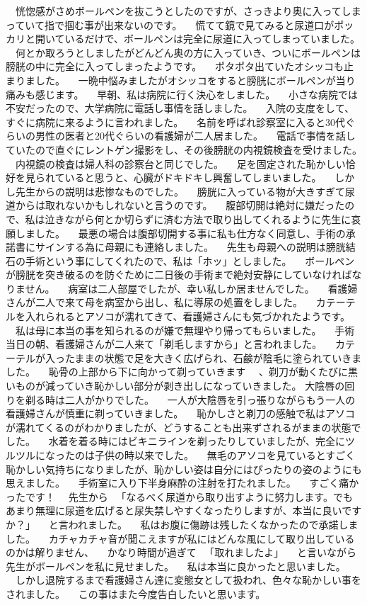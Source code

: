 　恍惚感がさめボールペンを抜こうとしたのですが、さっきより奥に入ってしまっていて指で掴む事が出来ないのです。 
　慌てて鏡で見てみると尿道口がポッカリと開いているだけで、ボールペンは完全に尿道に入ってしまっていました。 
　何とか取ろうとしましたがどんどん奥の方に入っていき、ついにボールペンは膀胱の中に完全に入ってしまったようです。 
　ポタポタ出ていたオシッコも止まりました。 
　一晩中悩みましたがオシッコをすると膀胱にボールペンが当り痛みも感じます。 
　早朝、私は病院に行く決心をしました。 
　小さな病院では不安だったので、大学病院に電話し事情を話しました。 
　入院の支度をして、すぐに病院に来るように言われました。 
　名前を呼ばれ診察室に入ると30代ぐらいの男性の医者と20代ぐらいの看護婦が二人居ました。 
　電話で事情を話していたので直ぐにレントゲン撮影をし、その後膀胱の内視鏡検査を受けました。 
　内視鏡の検査は婦人科の診察台と同じでした。 
　足を固定された恥かしい恰好を見られていると思うと、心臓がドキドキし興奮してしまいました。 
　しかし先生からの説明は悲惨なものでした。 
　膀胱に入っている物が大きすぎて尿道からは取れないかもしれないと言うのです。 
　腹部切開は絶対に嫌だったので、私は泣きながら何とか切らずに済む方法で取り出してくれるように先生に哀願しました。 
　最悪の場合は腹部切開する事に私も仕方なく同意し、手術の承諾書にサインする為に母親にも連絡しました。 
　先生も母親への説明は膀胱結石の手術という事にしてくれたので、私は「ホッ」としました。 
　ボールペンが膀胱を突き破るのを防ぐために二日後の手術まで絶対安静にしていなければなりません。 
　病室は二人部屋でしたが、幸い私しか居ませんでした。 
　看護婦さんが二人で来て母を病室から出し、私に導尿の処置をしました。 
　カテーテルを入れられるとアソコが濡れてきて、看護婦さんにも気づかれたようです。 
　私は母に本当の事を知られるのが嫌で無理やり帰ってもらいました。 
　手術当日の朝、看護婦さんが二人来て「剃毛しますから」と言われました。 
　カテーテルが入ったままの状態で足を大きく広げられ、石鹸が陰毛に塗られていきました。 
　恥骨の上部から下に向かって剃っていきます 
　、剃刀が動くたびに黒いものが減っていき恥かしい部分が剥き出しになっていきました。 
大陰唇の回りを剃る時は二人がかりでした。 
　一人が大陰唇を引っ張りながらもう一人の看護婦さんが慎重に剃っていきました。 
　恥かしさと剃刀の感触で私はアソコが濡れてくるのがわかりましたが、どうすることも出来ずされるがままの状態でした。 
　水着を着る時にはビキニラインを剃ったりしていましたが、完全にツルツルになったのは子供の時以来でした。 
　無毛のアソコを見ているとすごく恥かしい気持ちになりましたが、恥かしい姿は自分にはぴったりの姿のようにも思えました。 
　手術室に入り下半身麻酔の注射を打たれました。 
　すごく痛かったです！ 
　先生から 
　「なるべく尿道から取り出すように努力します。でもあまり無理に尿道を広げると尿失禁しやすくなったりしますが、本当に良いですか？」 
　と言われました。 
　私はお腹に傷跡は残したくなかったので承諾しました。 
　カチャカチャ音が聞こえますが私にはどんな風にして取り出しているのかは解りません、 
　かなり時間が過ぎて 
　「取れましたよ」 
　と言いながら先生がボールペンを私に見せました。 
　私は本当に良かったと思いました。 
　しかし退院するまで看護婦さん達に変態女として扱われ、色々な恥かしい事をされました。 
　この事はまた今度告白したいと思います。 

